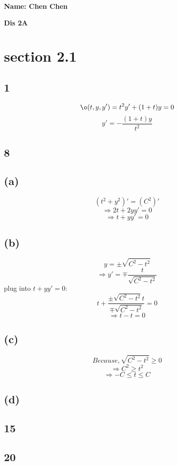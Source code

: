 \documentclass[12pt, a4paper]{IEEEtran}
\begin{document}
    \centerline{\textbf{Name: Chen Chen}}
    
    \centerline{\textbf{Dis 2A}}

    \section*{section 2.1}
    \subsection*{1}
    $$\o (t, y, y')=t^2y'+(1+t)y=0$$
    $$y'=-\frac{(1+t)y}{t^2}$$

    \subsection*{8}
    \subsection*{(a)}
    $$(t^2+y^2)'=(C^2)'$$
    $$\Rightarrow 2t+2yy'=0$$
    $$\Rightarrow t+yy'=0$$

    \subsection*{(b)}
    $$y=\pm \sqrt{C^2 -t^2}$$
    $$\Rightarrow y'=\mp \frac{t}{\sqrt{C^2-t^2}}$$
    plug into $t+yy'=0:$
    $$t+\frac{\pm \sqrt{C^2 -t^2}t}{\mp \sqrt{C^2-t^2}}=0$$
    $$\Rightarrow t-t=0$$

    \subsection*{(c)}
    $$Because , \sqrt{C^2-t^2}\geq 0$$
    $$\Rightarrow C^2 \geq t^2$$
    $$\Rightarrow -C\leq t \leq C$$

    \subsection*{(d)}
    \vspace{6cm}
    \subsection*{15}
    \vspace{6cm}
    \subsection*{20}
    \vspace{6cm}
\end{document}

